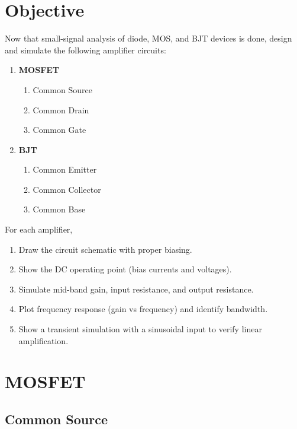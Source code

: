 \documentclass{article}
\begin{document}
\section{Objective}
Now that small-signal analysis of diode, MOS, and BJT devices is done, design and simulate the following amplifier circuits:
\begin{enumerate}
    \item \textbf{MOSFET}
    \begin{enumerate}
        \item Common Source
        \item Common Drain
        \item Common Gate
    \end{enumerate}
    \item \textbf{BJT}
    \begin{enumerate}
        \item Common Emitter
        \item Common Collector
        \item Common Base
    \end{enumerate}
\end{enumerate}
For each amplifier,
\begin{enumerate}
    \item Draw the circuit schematic with proper biasing.

    \item Show the DC operating point (bias currents and voltages).

    \item Simulate mid-band gain, input resistance, and output resistance.

    \item Plot frequency response (gain vs frequency) and identify bandwidth.

    \item Show a transient simulation with a sinusoidal input to verify linear amplification.
\end{enumerate}
\pagebreak
\section{MOSFET}
\subsection{Common Source}
\end{document}
